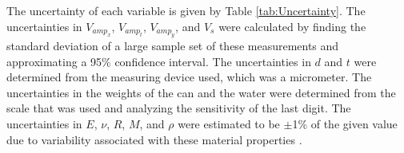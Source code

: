 \documentclass[10pt,journal,letterpaper]{IEEEtran}
\begin{document}
The uncertainty of each variable is given by Table \ref{tab:Uncertainty}.
The uncertainties in $V_{amp_{x}}$, $V_{amp_{t}}$, $V_{amp_{y}}$, and $V_{s}$ were calculated by finding the standard deviation of a large sample set of these measurements and approximating a 95\% confidence interval.
The uncertainties in $d$ and $t$ were determined from the measuring device used, which was a micrometer.
The uncertainties in the weights of the can and the water were determined from the scale that was used and analyzing the sensitivity of the last digit.
The uncertainties in $E$, $\nu$, $R$, $M$, and $\rho$ were estimated to be $\pm$1\% of the given value due to variability associated with these material properties \cite{b8}.
\begin{table}[H]
\renewcommand\arraystretch{1.25}
\centering
\caption{Uncertainty in Each Variable}
\end{table}
\end{document}
